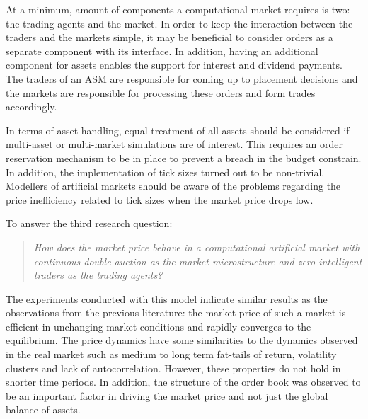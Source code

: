 At a minimum, amount of components a computational market requires is two: the trading agents and the 
market. In order to keep the interaction between the traders and the markets simple, it may be beneficial to 
consider orders as a separate component with its interface. In addition, having an additional component for 
assets enables the support for interest and dividend payments. The traders of an ASM are responsible for coming up to 
placement decisions and the markets are responsible for processing these orders and form trades accordingly. 

In terms of asset handling, equal treatment of 
all assets should be considered if multi-asset or multi-market simulations are of interest. 
This requires an order reservation mechanism to be in place to prevent a breach in the 
budget constrain. In addition, the implementation of tick sizes turned out to be non-trivial. 
Modellers of artificial markets should be aware of the problems regarding the price inefficiency 
related to tick sizes when the market price drops low. 


To answer the third research question:
\begin{quote}
    \textit{How does the market price behave in a computational artificial market with continuous
    double auction as the market microstructure and zero-intelligent traders as the 
    trading agents?} 
\end{quote}
The experiments conducted with this model indicate similar results as the observations from 
the previous literature: the market price of such a market is efficient in unchanging market conditions
and rapidly converges to the equilibrium. The price dynamics have some similarities to the dynamics 
observed in the real market such as medium to long term fat-tails of return, volatility clusters and 
lack of autocorrelation. However, these properties do not hold in shorter time periods. In addition, 
the structure of the order book was observed to be an important factor in driving the market price and 
not just the global balance of assets. 



